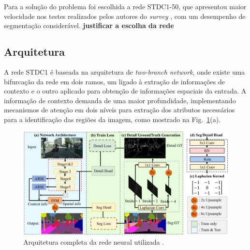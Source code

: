 \documentclass[conference]{IEEEtran}
\begin{document}
Para a solução do problema foi escolhida a rede STDC1-50, que apresentou maior velocidade nos testes realizados pelos autores do \textit{survey} \cite{papadeas2021RealTimeSemanticImage}, com um desempenho de segmentação considerável. \textbf{justificar a escolha da rede}

\subsection{Arquitetura}

A rede STDC1 \cite{fan2021RethinkingBiSeNetRealtime} é baseada na arquitetura de \textit{two-branch network}, onde existe uma bifurcação da rede em dois ramos, um ligado à extração de informações de contexto e o outro aplicado para obtenção de informações espaciais da entrada. A informação de contexto demanda de uma maior profundidade, implementando mecanismos de atenção em dois níveis para extração dos atributos necessários para a identificação das regiões da imagem, como mostrado na Fig.~\ref{fig:stdcseg-architecture}(a).

\begin{figure}[h!]
	\centering
	\includegraphics[width=1\linewidth]{img/stdcseg-architecture}
	\caption{Arquitetura completa da rede neural utilizada \cite{fan2021RethinkingBiSeNetRealtime}.}
	\label{fig:stdcseg-architecture}
\end{figure}
\end{document}
